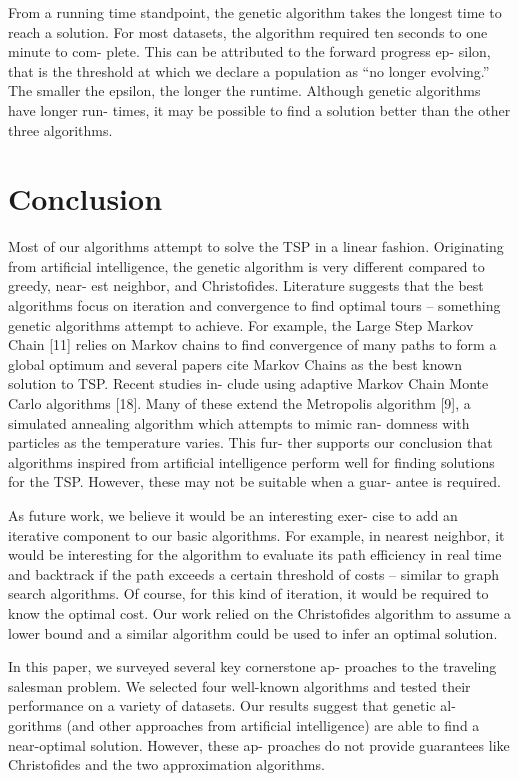 \documentclass[10pt,twocolumn,letterpaper]{article}
\begin{document}
From a running time standpoint, the genetic algorithm
takes the longest time to reach a solution. For most datasets,
the algorithm required ten seconds to one minute to com-
plete. This can be attributed to the forward progress ep-
silon, that is the threshold at which we declare a population
as “no longer evolving.” The smaller the epsilon, the longer
the runtime. Although genetic algorithms have longer run-
times, it may be possible to find a solution better than the
other three algorithms.

\section{Conclusion}
Most of our algorithms attempt to solve the TSP in a
linear fashion. Originating from artificial intelligence, the
genetic algorithm is very different compared to greedy, near-
est neighbor, and Christofides. Literature suggests that the
best algorithms focus on iteration and convergence to find
optimal tours – something genetic algorithms attempt to
achieve. For example, the Large Step Markov Chain [11]
relies on Markov chains to find convergence of many paths
to form a global optimum and several papers cite Markov
Chains as the best known solution to TSP. Recent studies in-
clude using adaptive Markov Chain Monte Carlo algorithms
[18]. Many of these extend the Metropolis algorithm [9], a
simulated annealing algorithm which attempts to mimic ran-
domness with particles as the temperature varies. This fur-
ther supports our conclusion that algorithms inspired from
artificial intelligence perform well for finding solutions for
the TSP. However, these may not be suitable when a guar-
antee is required.

As future work, we believe it would be an interesting exer-
cise to add an iterative component to our basic algorithms.
For example, in nearest neighbor, it would be interesting for
the algorithm to evaluate its path efficiency in real time and
backtrack if the path exceeds a certain threshold of costs –
similar to graph search algorithms. Of course, for this kind
of iteration, it would be required to know the optimal cost.
Our work relied on the Christofides algorithm to assume a
lower bound and a similar algorithm could be used to infer
an optimal solution.

In this paper, we surveyed several key cornerstone ap-
proaches to the traveling salesman problem. We selected
four well-known algorithms and tested their performance on
a variety of datasets. Our results suggest that genetic al-
gorithms (and other approaches from artificial intelligence)
are able to find a near-optimal solution. However, these ap-
proaches do not provide guarantees like Christofides and the
two approximation algorithms.

{\small


}
\end{document}

